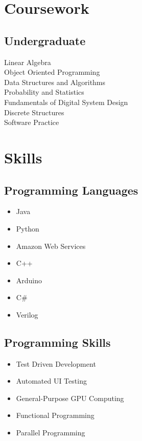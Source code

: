 \documentclass[letterpaper]{deedy-resume} %
\begin{document}
\begin{minipage}[t]{0.35\textwidth}
\section{Coursework}


\subsection{Undergraduate}

Linear Algebra \\
Object Oriented Programming \\
Data Structures and Algorithms \\
Probability and Statistics \\
Fundamentals of Digital System Design \\
Discrete Structures \\
Software Practice \\


\sectionspace %


\section{Skills}

\subsection{Programming Languages}
\begin{itemize}
\item Java
\item Python
\item Amazon Web Services
\item C++ 
\item Arduino
\item C\#
\item Verilog
\end{itemize}

\subsection{Programming Skills}
\begin{itemize}
\item Test Driven Development
\item Automated UI Testing
\item General-Purpose GPU Computing
\item Functional Programming
\item Parallel Programming
\end{itemize}


\end{minipage}
\end{document}
